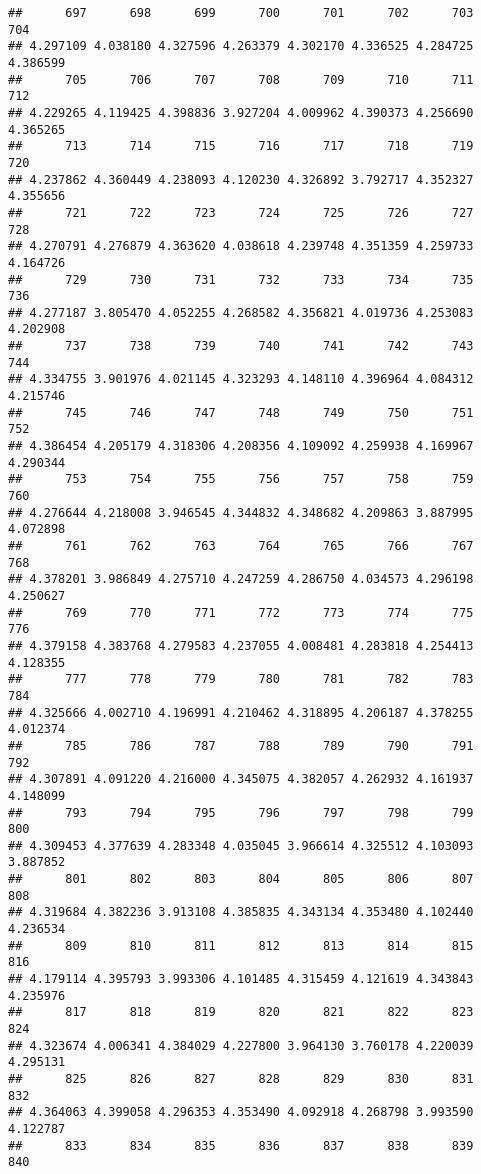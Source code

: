 \documentclass[
]{article}
\begin{document}
\begin{verbatim}
##      697      698      699      700      701      702      703      704 
## 4.297109 4.038180 4.327596 4.263379 4.302170 4.336525 4.284725 4.386599 
##      705      706      707      708      709      710      711      712 
## 4.229265 4.119425 4.398836 3.927204 4.009962 4.390373 4.256690 4.365265 
##      713      714      715      716      717      718      719      720 
## 4.237862 4.360449 4.238093 4.120230 4.326892 3.792717 4.352327 4.355656 
##      721      722      723      724      725      726      727      728 
## 4.270791 4.276879 4.363620 4.038618 4.239748 4.351359 4.259733 4.164726 
##      729      730      731      732      733      734      735      736 
## 4.277187 3.805470 4.052255 4.268582 4.356821 4.019736 4.253083 4.202908 
##      737      738      739      740      741      742      743      744 
## 4.334755 3.901976 4.021145 4.323293 4.148110 4.396964 4.084312 4.215746 
##      745      746      747      748      749      750      751      752 
## 4.386454 4.205179 4.318306 4.208356 4.109092 4.259938 4.169967 4.290344 
##      753      754      755      756      757      758      759      760 
## 4.276644 4.218008 3.946545 4.344832 4.348682 4.209863 3.887995 4.072898 
##      761      762      763      764      765      766      767      768 
## 4.378201 3.986849 4.275710 4.247259 4.286750 4.034573 4.296198 4.250627 
##      769      770      771      772      773      774      775      776 
## 4.379158 4.383768 4.279583 4.237055 4.008481 4.283818 4.254413 4.128355 
##      777      778      779      780      781      782      783      784 
## 4.325666 4.002710 4.196991 4.210462 4.318895 4.206187 4.378255 4.012374 
##      785      786      787      788      789      790      791      792 
## 4.307891 4.091220 4.216000 4.345075 4.382057 4.262932 4.161937 4.148099 
##      793      794      795      796      797      798      799      800 
## 4.309453 4.377639 4.283348 4.035045 3.966614 4.325512 4.103093 3.887852 
##      801      802      803      804      805      806      807      808 
## 4.319684 4.382236 3.913108 4.385835 4.343134 4.353480 4.102440 4.236534 
##      809      810      811      812      813      814      815      816 
## 4.179114 4.395793 3.993306 4.101485 4.315459 4.121619 4.343843 4.235976 
##      817      818      819      820      821      822      823      824 
## 4.323674 4.006341 4.384029 4.227800 3.964130 3.760178 4.220039 4.295131 
##      825      826      827      828      829      830      831      832 
## 4.364063 4.399058 4.296353 4.353490 4.092918 4.268798 3.993590 4.122787 
##      833      834      835      836      837      838      839      840 

\end{verbatim}
\end{document}
